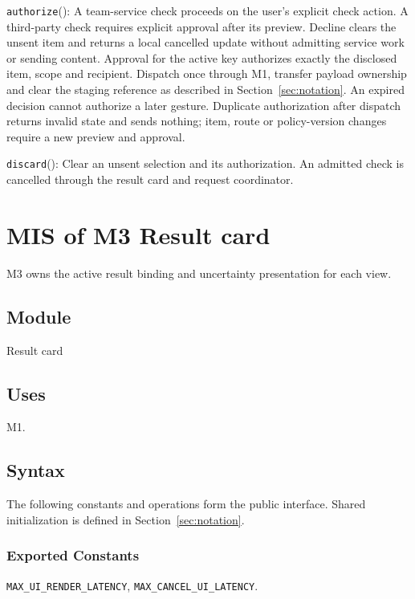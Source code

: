 \documentclass[12pt, titlepage]{article}
\newcommand{\Const}[1]{\texttt{#1}}
\begin{document}
\medskip\noindent \texttt{authorize}():
A team-service check proceeds on the user's explicit check action. A third-party check requires explicit approval after its preview. Decline clears the unsent item and returns a local cancelled update without admitting service work or sending content. Approval for the active key authorizes exactly the disclosed item, scope and recipient. Dispatch once through M1, transfer payload ownership and clear the staging reference as described in Section~\ref{sec:notation}. An expired decision cannot authorize a later gesture. Duplicate authorization after dispatch returns invalid state and sends nothing; item, route or policy-version changes require a new preview and approval.

\medskip\noindent \texttt{discard}():
Clear an unsent selection and its authorization. An admitted check is cancelled through the result card and request coordinator.

\clearpage
\section{MIS of M3 Result card} \label{sec:m3}

M3 owns the active result binding and uncertainty presentation for each view.

\subsection{Module}

Result card

\subsection{Uses}

M1.

\subsection{Syntax}

The following constants and operations form the public interface. Shared initialization is defined in Section~\ref{sec:notation}.

\subsubsection{Exported Constants}

\Const{MAX\_\allowbreak{}UI\_\allowbreak{}RENDER\_\allowbreak{}LATENCY}, \Const{MAX\_\allowbreak{}CANCEL\_\allowbreak{}UI\_\allowbreak{}LATENCY}.
\end{document}
